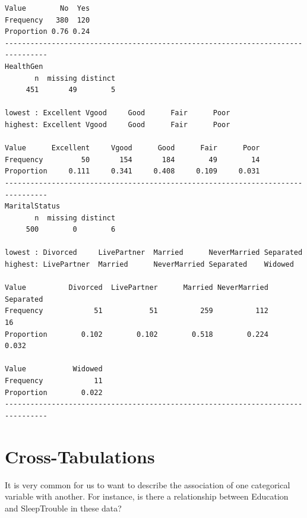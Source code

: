 \documentclass[
]{book}
\newenvironment{Shaded}{\begin{snugshade}}{\end{snugshade}}
\newcommand{\DataTypeTok}[1]{\textcolor[rgb]{0.13,0.29,0.53}{#1}}
\newcommand{\KeywordTok}[1]{\textcolor[rgb]{0.13,0.29,0.53}{\textbf{#1}}}
\newcommand{\NormalTok}[1]{#1}
\newcommand{\OperatorTok}[1]{\textcolor[rgb]{0.81,0.36,0.00}{\textbf{#1}}}
\newcommand{\StringTok}[1]{\textcolor[rgb]{0.31,0.60,0.02}{#1}}
\begin{document}
\begin{verbatim}
Value        No  Yes
Frequency   380  120
Proportion 0.76 0.24
--------------------------------------------------------------------------------
HealthGen 
       n  missing distinct 
     451       49        5 

lowest : Excellent Vgood     Good      Fair      Poor     
highest: Excellent Vgood     Good      Fair      Poor     
                                                            
Value      Excellent     Vgood      Good      Fair      Poor
Frequency         50       154       184        49        14
Proportion     0.111     0.341     0.408     0.109     0.031
--------------------------------------------------------------------------------
MaritalStatus 
       n  missing distinct 
     500        0        6 

lowest : Divorced     LivePartner  Married      NeverMarried Separated   
highest: LivePartner  Married      NeverMarried Separated    Widowed     
                                                                           
Value          Divorced  LivePartner      Married NeverMarried    Separated
Frequency            51           51          259          112           16
Proportion        0.102        0.102        0.518        0.224        0.032
                       
Value           Widowed
Frequency            11
Proportion        0.022
--------------------------------------------------------------------------------
\end{verbatim}

\hypertarget{cross-tabulations}{%
\section{Cross-Tabulations}\label{cross-tabulations}}

It is very common for us to want to describe the association of one categorical variable with another. For instance, is there a relationship between Education and SleepTrouble in these data?

\begin{Shaded}
\end{Shaded}
\end{document}
